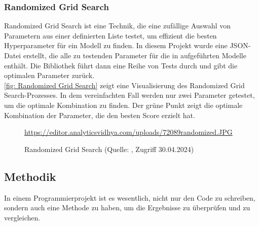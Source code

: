 \subsubsection{Randomized Grid Search}\label{sec: Randomized Grid Search}
Randomized Grid Search ist eine Technik, die eine zufällige Auswahl von Parametern aus einer definierten Liste testet, um effizient die besten Hyperparameter für ein Modell zu finden. In diesem Projekt wurde eine JSON-Datei erstellt, die alle zu testenden Parameter für die in  aufgeführten Modelle enthält. Die Bibliothek führt dann eine Reihe von Tests durch und gibt die optimalen Parameter zurück.\\
\autoref{fig: Randomized Grid Search} zeigt eine Visualisierung des Randomized Grid Search-Prozesses. In dem vereinfachten Fall werden nur zwei Parameter getestet, um die optimale Kombination zu finden.
Der grüne Punkt zeigt die optimale Kombination der Parameter, die den besten Score erzielt hat.
\begin{figure}[H]
    \centering
    \urldef{\myurl}\url{https://editor.analyticsvidhya.com/uploads/72089randomized.JPG}
    \caption[Randomized Grid Search]{Randomized Grid Search (Quelle: \protect\myurl{}, Zugriff 30.04.2024)}
    \label{fig: Randomized Grid Search}
\end{figure}

\subsection{Methodik}\label{sec: Methodik}
In einem Programmierprojekt ist es wesentlich, nicht nur den Code zu schreiben, sondern auch eine Methode zu haben, um die Ergebnisse zu überprüfen und zu vergleichen.

